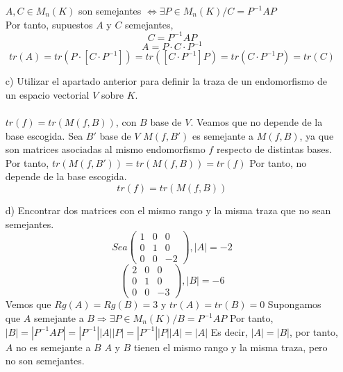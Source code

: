 \begin{ejercicio}
\begin{itemize}
        $A,C \in M_n(K)$ son semejantes $\Leftrightarrow \exists P\in M_n(K)/C=P^{-1}AP$\\
        Por tanto, supuestos $A$ y $C$ semejantes,\\
        \begin{equation*}
            C=P^{-1}AP
        \end{equation*}
        \begin{equation*}
            A=P\cdot C\cdot P^{-1}
        \end{equation*}
        \begin{equation*}
            tr(A)=tr(P\cdot [C\cdot P^{-1}])=tr([C\cdot P^{-1}]P)=tr(C\cdot P^{-1}P)=tr(C)
        \end{equation*}
        \item[c)] Utilizar el apartado anterior para definir la traza de un endomorfismo de un espacio vectorial $V$ sobre $K$.\\ \\
        $tr(f)=tr(M(f,B))$, con $B$ base de $V$.
        Veamos que no depende de la base escogida.
        Sea $B'$ base de $V$
        $M(f,B')$ es semejante a $M(f,B)$, ya que son matrices asociadas al mismo endomorfismo $f$ respecto de distintas bases.\\
        Por tanto, $tr(M(f,B'))=tr(M(f,B))=tr(f)$
        Por tanto, no depende de la base escogida.\\
        \begin{equation*}
            tr(f)=tr(M(f,B))
        \end{equation*}
        \item[d)] Encontrar dos matrices con el mismo rango y la misma traza que no sean semejantes.\\
        \begin{equation*}
            Sea
            \begin{pmatrix}
            1 & 0 & 0\\
            0 & 1 & 0\\
            0 & 0 & -2
        \end{pmatrix}
        , |A|=-2
        \end{equation*}
        \begin{equation*}
            \begin{pmatrix}
            2 & 0 & 0\\
            0 & 1 & 0\\
            0 & 0 & -3
            \end{pmatrix}
            , |B|=-6
        \end{equation*}
        Vemos que $Rg(A)=Rg(B)=3$ y $tr(A)=tr(B)=0$
        Supongamos que $A$ semejante a $B \Rightarrow \exists P\in M_n(K)/B=P^{-1}AP$
        Por tanto, $|B|=|P^{-1}AP|=|P^{-1}||A||P|=|P^{-1}||P||A|=|A|$
        Es decir, $|A|=|B|$, por tanto, $A$ no es semejante a $B$
        $A$ y $B$ tienen el mismo rango y la misma traza, pero no son semejantes.
    \end{itemize}
    \end{ejercicio}  





\newpage
